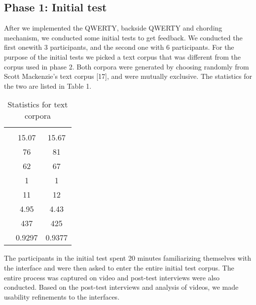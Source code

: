 \subsection{Phase 1: Initial test}

After we implemented the QWERTY, backside QWERTY and chording
mechanism, we conducted some initial tests to get feedback. We
conducted the first onewith 3 participants, and the
second one with 6 participants. For the purpose of the initial tests
we picked a text corpus that was different from the corpus used in
phase 2. Both corpora were generated by choosing randomly from Scott
Mackenzie's text corpus [17], and were mutually exclusive. The
statistics for the two are listed in Table 1.

\begin{table}
	\centering
		\begin{tabular}{rcc}
		                         & \begin{minipage}{2cm} \centering \color{grey}{Study corpus}\end{minipage} & \begin{minipage}{2cm} \centering \color{grey}{Initial test corpus}\end{minipage}  \\ 
			 \color{grey}{Average phrase length} & 15.07 & 15.67 \\ 
			 \color{grey}{Number of words} & 76 & 81 \\ 
			 \color{grey}{Unique words} & 62 & 67 \\ 
			 \color{grey}{Min. length of word} & 1 & 1 \\ 
			 \color{grey}{Max. length of word} & 11 & 12 \\ 
			 \color{grey}{Average word length} & 4.95 & 4.43 \\ 
			 \color{grey}{Number of characters} & 437 & 425 \\ 
			 \color{grey}{Correlation with English} & 0.9297 & 0.9377 \\ 
		\end{tabular}
	\caption{Statistics for text corpora}
	\label{tab:StatisticsForTextCorpora}
\end{table}

The participants in the initial test spent 20 minutes familiarizing
themselves with the interface and were then asked to enter the entire
initial test corpus. The entire process was captured on video and
post-test interviews were also conducted. Based on the post-test
interviews and analysis of videos, we made usability refinements to
the interfaces.

